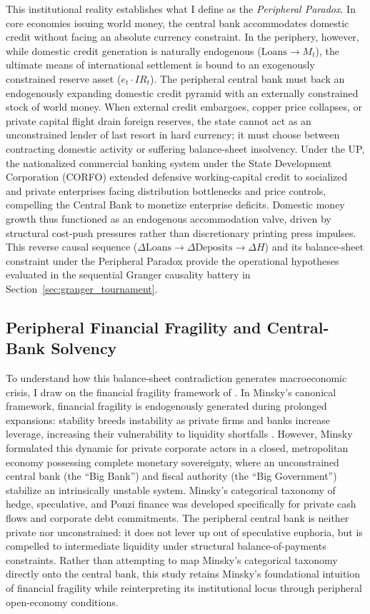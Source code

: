 This institutional reality establishes what I define as the \emph{Peripheral Paradox}. In core economies issuing world money, the central bank accommodates domestic credit without facing an absolute currency constraint. In the periphery, however, while domestic credit generation is naturally endogenous ($\text{Loans} \to M_t$), the ultimate means of international settlement is bound to an exogenously constrained reserve asset ($e_t \cdot IR_t$). The peripheral central bank must back an endogenously expanding domestic credit pyramid with an externally constrained stock of world money. When external credit embargoes, copper price collapses, or private capital flight drain foreign reserves, the state cannot act as an unconstrained lender of last resort in hard currency; it must choose between contracting domestic activity or suffering balance-sheet insolvency. Under the UP, the nationalized commercial banking system under the State Development Corporation (CORFO) extended defensive working-capital credit to socialized and private enterprises facing distribution bottlenecks and price controls, compelling the Central Bank to monetize enterprise deficits. Domestic money growth thus functioned as an endogenous accommodation valve, driven by structural cost-push pressures rather than discretionary printing press impulses. This reverse causal sequence ($\Delta \text{Loans} \to \Delta \text{Deposits} \to \Delta H$) and its balance-sheet constraint under the Peripheral Paradox provide the operational hypotheses evaluated in the sequential Granger causality battery in Section~\ref{sec:granger_tournament}.

\subsection{Peripheral Financial Fragility and Central-Bank Solvency}
\label{sec:B5_foley_chamorro_minsky}

To understand how this balance-sheet contradiction generates macroeconomic crisis, I draw on the financial fragility framework of \citet{Minsky1986}. In Minsky's canonical framework, financial fragility is endogenously generated during prolonged expansions: stability breeds instability as private firms and banks increase leverage, increasing their vulnerability to liquidity shortfalls \citep{Kregel2008}. However, Minsky formulated this dynamic for private corporate actors in a closed, metropolitan economy possessing complete monetary sovereignty, where an unconstrained central bank (the ``Big Bank'') and fiscal authority (the ``Big Government'') stabilize an intrinsically unstable system. Minsky's categorical taxonomy of hedge, speculative, and Ponzi finance was developed specifically for private cash flows and corporate debt commitments. The peripheral central bank is neither private nor unconstrained: it does not lever up out of speculative euphoria, but is compelled to intermediate liquidity under structural balance-of-payments constraints. Rather than attempting to map Minsky's categorical taxonomy directly onto the central bank, this study retains Minsky's foundational intuition of financial fragility while reinterpreting its institutional locus through peripheral open-economy conditions.

